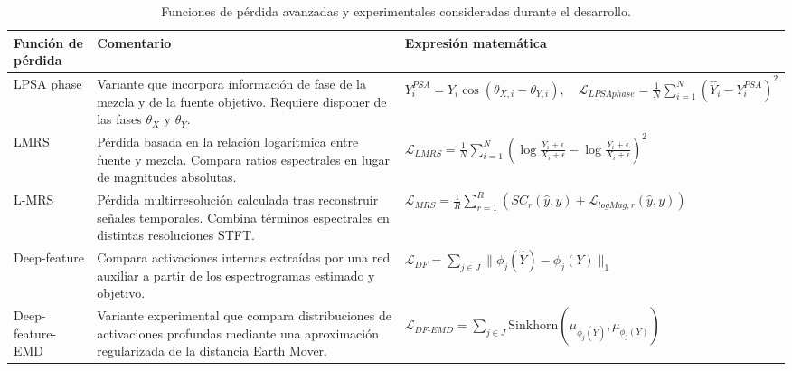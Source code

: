 \begin{table}[H]
    \centering
    \small
    \begin{adjustbox}{max width=\textwidth}
        \begin{tabular}{p{} p{} p{}}
            \toprule
            \textbf{Función de pérdida} & \textbf{Comentario} & \textbf{Expresión matemática} \\
            \midrule

            LPSA phase &
            Variante que incorpora información de fase de la mezcla y de la fuente objetivo. Requiere disponer de las fases \(\theta_X\) y \(\theta_Y\). &
            \( Y^{PSA}_i = Y_i \cos(\theta_{X,i}-\theta_{Y,i}), \quad \mathcal{L}_{LPSAphase} = \frac{1}{N}\sum_{i=1}^{N}(\hat{Y}_i-Y^{PSA}_i)^2 \)
            \\

            LMRS &
            Pérdida basada en la relación logarítmica entre fuente y mezcla. Compara ratios espectrales en lugar de magnitudes absolutas. &
            \( \mathcal{L}_{LMRS} = \frac{1}{N}\sum_{i=1}^{N}\left(\log\frac{Y_i+\epsilon}{X_i+\epsilon}-\log\frac{\hat{Y}_i+\epsilon}{X_i+\epsilon}\right)^2 \)
            \\

            L-MRS &
            Pérdida multirresolución calculada tras reconstruir señales temporales. Combina términos espectrales en distintas resoluciones STFT. &
            \( \mathcal{L}_{MRS} = \frac{1}{R}\sum_{r=1}^{R}\left(SC_r(\hat{y},y)+\mathcal{L}_{logMag,r}(\hat{y},y)\right) \)
            \\

            Deep-feature &
            Compara activaciones internas extraídas por una red auxiliar a partir de los espectrogramas estimado y objetivo. &
            \( \mathcal{L}_{DF} = \sum_{j \in J}\|\phi_j(\hat{Y})-\phi_j(Y)\|_1 \)
            \\

            Deep-feature-EMD &
            Variante experimental que compara distribuciones de activaciones profundas mediante una aproximación regularizada de la distancia Earth Mover. &
            \( \mathcal{L}_{DF\text{-}EMD} = \sum_{j \in J}\mathrm{Sinkhorn}\left(\mu_{\phi_j(\hat{Y})},\mu_{\phi_j(Y)}\right) \)
            \\

            \bottomrule
        \end{tabular}
    \end{adjustbox}
    \caption{Funciones de pérdida avanzadas y experimentales consideradas durante el desarrollo.}
    \label{tab:perdidas-avanzadas}
\end{table}

